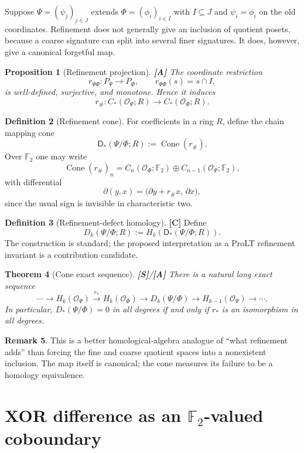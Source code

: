 \documentclass[11pt]{article}
\newtheorem{theorem}{Theorem}[section]
\newtheorem{proposition}[theorem]{Proposition}
\theoremstyle{definition}
\newtheorem{definition}[theorem]{Definition}
\newtheorem{remark}[theorem]{Remark}
\newcommand{\F}{\mathbb F_2}
\newcommand{\OX}{\mathcal O}
\newcommand{\Cone}{\operatorname{Cone}}
\newcommand{\statusS}{\textbf{[S]}}
\newcommand{\statusA}{\textbf{[A]}}
\newcommand{\statusC}{\textbf{[C]}}
\begin{document}
Suppose $\Psi=(\psi_j)_{j\in J}$ extends $\Phi=(\phi_i)_{i\in I}$ with $I\subseteq J$ and $\psi_i=\phi_i$ on the old coordinates. Refinement does not generally give an inclusion of quotient posets, because a coarse signature can split into several finer signatures. It does, however, give a canonical forgetful map.

\begin{proposition}[Refinement projection]\label{prop:refine}
\statusA\;
The coordinate restriction
\[
r_{\Psi\Phi}:P_\Psi\longrightarrow P_\Phi,
\qquad
r_{\Psi\Phi}(s)=s\cap I,
\]
is well-defined, surjective, and monotone. Hence it induces
\[
r_\#:C_*(\OX_\Psi;R)\longrightarrow C_*(\OX_\Phi;R).
\]
\end{proposition}

\begin{definition}[Refinement cone]
For coefficients in a ring $R$, define the chain mapping cone
\[
\mathsf D_*(\Psi/\Phi;R):=\Cone(r_\#).
\]
Over $\F$ one may write
\[
\Cone(r_\#)_n=C_n(\OX_\Phi;\F)\oplus C_{n-1}(\OX_\Psi;\F),
\]
with differential
\[
\partial(y,x)=\bigl(\partial y+r_\#x,\,\partial x\bigr),
\]
since the usual sign is invisible in characteristic two.
\end{definition}

\begin{definition}[Refinement-defect homology]
\statusC\;
Define
\[
D_k(\Psi/\Phi;R):=H_k(\mathsf D_*(\Psi/\Phi;R)).
\]
The construction is standard; the proposed interpretation as a ProLT refinement invariant is a contribution candidate.
\end{definition}

\begin{theorem}[Cone exact sequence]\label{thm:cone}
\statusS/\statusA\;
There is a natural long exact sequence
\[
\cdots\to H_k(\OX_\Psi)
\overset{r_*}{\longrightarrow}H_k(\OX_\Phi)
\to D_k(\Psi/\Phi)
\to H_{k-1}(\OX_\Psi)\to\cdots.
\]
In particular, $D_*(\Psi/\Phi)=0$ in all degrees if and only if $r_*$ is an isomorphism in all degrees.
\end{theorem}

\begin{remark}
This is a better homological-algebra analogue of ``what refinement adds'' than forcing the fine and coarse quotient spaces into a nonexistent inclusion. The map itself is canonical; the cone measures its failure to be a homology equivalence.
\end{remark}

\section{XOR difference as an $\F$-valued coboundary}
\end{document}
